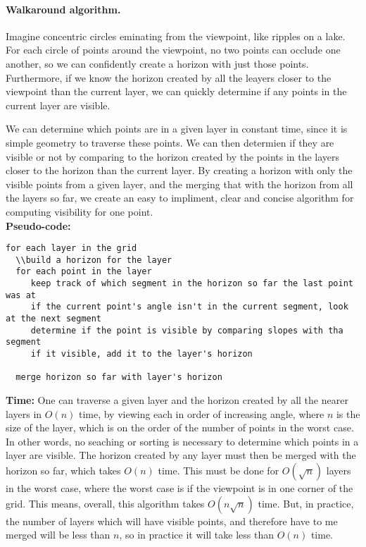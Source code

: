 \documentclass[11pt,twocolumn]{article}
\begin{document}
\paragraph{Walkaround algorithm.}
Imagine concentric circles eminating from the viewpoint, like ripples on a lake.  For each circle of points around the viewpoint, no two points can occlude one another, so we can confidently create a horizon with just those points.  Furthermore, if we know the horizon created by all the leayers closer to the viewpoint than the current layer, we can quickly determine if any points in the current layer are visible.

We can determine which points are in a given layer in constant time, since it is simple geometry to traverse these points.  We can then determien if they are visible or not by comparing to the horizon created by the points in the layers closer to the horizon than the current layer.  By creating a horizon with only the visible points from a given layer, and the merging that with the horizon from all the layers so far, we create an easy to impliment, clear and concise algorithm for computing visibility for one point.\\
{\bf Pseudo-code:}
\begin{verbatim}
for each layer in the grid
  \\build a horizon for the layer
  for each point in the layer
     keep track of which segment in the horizon so far the last point was at
     if the current point's angle isn't in the current segment, look at the next segment
     determine if the point is visible by comparing slopes with tha segment
     if it visible, add it to the layer's horizon
  
  merge horizon so far with layer's horizon

\end{verbatim}
{\bf Time:} One can traverse a given layer and the horizon created by all the nearer layers in $O(n)$ time, by viewing each in order of increasing angle, where $n$ is the size of the layer, which is on the order of the number of points in the worst case.  In other words, no seaching or sorting is necessary to determine which points in a layer are visible.  The horizon created by any layer must then be merged with the horizon so far, which takes $O(n)$ time.  This must be done for $O(\sqrt{n})$ layers in the worst case, where the worst case is if the viewpoint is in one corner of the grid.  This means, overall, this algorithm takes $O(n\sqrt{n})$ time.  But, in practice, the number of layers which will have visible points, and therefore have to me merged will be less than $n$, so in practice it will take less than $O(n)$ time.
\end{document}
